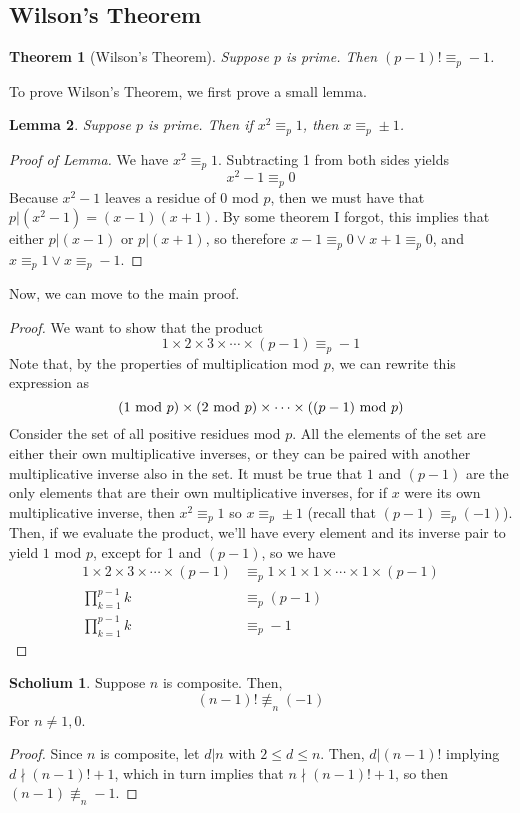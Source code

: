 \documentclass[10pt]{article}
\newtheorem{theorem}{Theorem}[section]
\newtheorem{lemma}[theorem]{Lemma}
\theoremstyle{definition}
\newtheorem{scholium}{Scholium}
\begin{document}
\subsection{Wilson's Theorem}
\begin{theorem}[Wilson's Theorem]
Suppose $p$ is prime.  Then $(p-1)! \equiv_p -1$.  
\end{theorem}
To prove Wilson's Theorem, we first prove a small lemma.  
\begin{lemma}
Suppose $p$ is prime.  Then if $x^2 \equiv_p 1$, then $x\equiv_p \pm 1$.  
\end{lemma}
\begin{proof}[Proof of Lemma]
We have $x^2 \equiv_p 1$.  Subtracting 1 from both sides yields 
\[x^2 - 1 \equiv_p 0\]
Because $x^2-1$ leaves a residue of 0 mod $p$, then we must have that $p|(x^2-1) = (x-1)(x+1)$.  By some theorem I forgot, this implies that either $p|(x-1)$ or $p|(x+1)$, so therefore $x-1\equiv_p 0 \lor x+1\equiv_p 0$, and $x\equiv_p 1 \lor x\equiv_p -1$.  
\end{proof}
Now, we can move to the main proof.
\begin{proof}
We want to show that the product 
\[1\times 2 \times 3 \times \cdots \times (p-1) \equiv_p -1\]
Note that, by the properties of multiplication mod $p$, we can rewrite this expression as 
\[ (1 \textnormal{~mod~} p) \times (2\textnormal{~mod~} p) \times \cdots \times ((p-1) \textnormal{~mod~} p) \]
Consider the set of all positive residues mod $p$.  All the elements of the set are either their own multiplicative inverses, or they can be paired with another multiplicative inverse also in the set.  It must be true that $1$ and $(p-1)$ are the only elements that are their own multiplicative inverses, for if $x$ were its own multiplicative inverse, then $x^2 \equiv_p 1$ so $x\equiv_p \pm 1$ (recall that $(p-1)\equiv_p (-1)$).  Then, if we evaluate the product, we'll have every element and its inverse pair to yield $1$ mod $p$, except for 1 and $(p-1)$, so we have 
\begin{align*}
1\times 2 \times 3 \times \cdots \times (p-1) &\equiv_p 1\times 1 \times 1 \times \cdots \times 1\times (p-1) \\ 
\prod_{k=1}^{p-1} k &\equiv_p (p-1) \\ 
\prod_{k=1}^{p-1} k &\equiv_p -1
\end{align*}
\end{proof}
\begin{scholium}
Suppose $n$ is composite. Then, 
\[(n-1)!\not\equiv_n (-1)\]
For $n\neq 1,0$.   
\end{scholium}
\begin{proof}
Since $n$ is composite, let $d|n$ with $2\leq d \leq n$.  Then, $d|(n-1)!$ implying $d\nmid (n-1)! + 1$, which in turn implies that $n\nmid(n-1)! +1$, so then $(n-1)\not\equiv_n -1$.
\end{proof}
\end{document}
